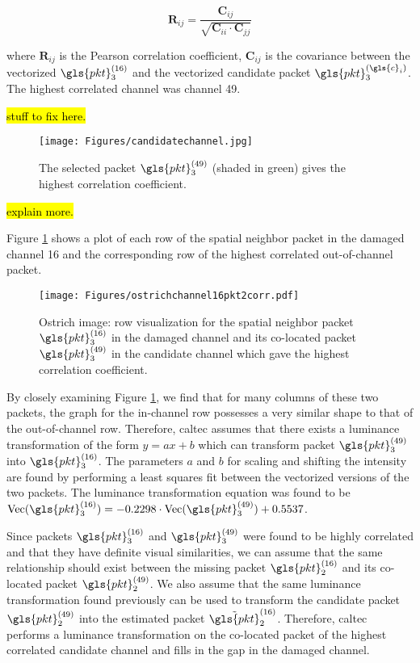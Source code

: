 \begin{equation}
	\mathbf{R}_{ij} = \frac{\mathbf{C}_{ij}}{\sqrt{\mathbf{C}_{ii} \cdot \mathbf{C}_{jj}}}
\end{equation}

where $\mathbf{R}_{ij}$ is the Pearson correlation coefficient, $\mathbf{C}_{ij}$ is the covariance between the vectorized $\gls{pkt}_3^{(16)}$ and the vectorized candidate packet $\gls{pkt}_3^{(\gls{c}_i)}$. The highest correlated channel was channel 49.

\hl{stuff to fix here.}

\begin{figure}[H]
	\centering
	\texttt{[image: Figures/candidatechannel.jpg]}
	\caption[Selected candidate packet with highest correlation coefficient]{The selected packet $\gls{pkt}_3^{(49)}$ (shaded in green) gives the highest correlation coefficient.}
\end{figure}

\hl{explain more.}


Figure \ref{fig:caltec:corrcoef} shows a plot of each row of the spatial neighbor packet in the damaged channel 16 and the corresponding row of the highest correlated out-of-channel packet.

\begin{figure}[H]
	\centering
	\texttt{[image: Figures/ostrichchannel16pkt2corr.pdf]}
	\caption[Ostrich image: row visualization of spatial neighbor packet]{Ostrich image: row visualization for the spatial neighbor packet $\gls{pkt}_3^{(16)}$ in the damaged channel and its co-located packet $\gls{pkt}_3^{(49)}$ in the candidate channel which gave the highest correlation coefficient.}
	\label{fig:caltec:corrcoef}
\end{figure}

By closely examining Figure \ref{fig:caltec:corrcoef}, we find that for many columns of these two packets, the graph for the in-channel row possesses a very similar shape to that of the out-of-channel row. Therefore, \gls{caltec} assumes that there exists a luminance transformation of the form $y=ax+b$ which can transform packet $\gls{pkt}_3^{(49)}$ into $\gls{pkt}_3^{(16)}$. The parameters $a$ and $b$ for scaling and shifting the intensity are found by performing a least squares fit between the vectorized versions of the two packets. The luminance transformation equation was found to be $\text{Vec}(\gls{pkt}_3^{(16)}) = -0.2298 \cdot \text{Vec}(\gls{pkt}_3^{(49)}) + 0.5537$.

Since packets $\gls{pkt}_3^{(16)}$ and $\gls{pkt}_3^{(49)}$ were found to be highly correlated and that they have definite visual similarities, we can assume that the same relationship should exist between the missing packet $\gls{pkt}_2^{(16)}$ and its co-located packet $\gls{pkt}_2^{(49)}$. We also assume that the same luminance transformation found previously can be used to transform the candidate packet $\gls{pkt}_2^{(49)}$ into the estimated packet $\tilde{\gls{pkt}}_2^{(16)}$. Therefore, \gls{caltec} performs a luminance transformation on the co-located packet of the highest correlated candidate channel and fills in the gap in the damaged channel.

